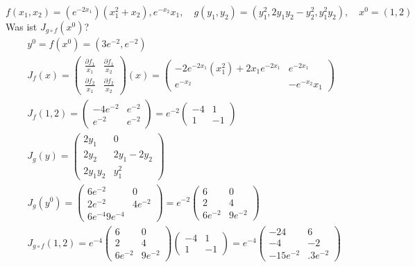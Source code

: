 \begin{beispiel*}
	\[ f(x_1,x_2)=(e^{-2x_1})(x_1^2+x_2),e^{-x_2}x_1,\quad g(y_1,y_2)=(y_1^2,2y_1y_2-y_2^2,y_1^2y_2),\quad x^0=(1,2) \]
	Was ist $ J_{g\circ f}(x^0) $?
	\begin{align*} &y^0=f(x^0)=(3e^{-2},e^{-2})\\
	&J_f(x)=\begin{pmatrix}
	\frac{\partial f_1}{x_1}&\frac{\partial f_1}{x_2}\\\frac{\partial f_2}{x_1}&\frac{\partial f_2}{x_2}
	\end{pmatrix}(x)=\begin{pmatrix}
	-2e^{-2x_1}(x_1^2)+2x_1e^{-2x_1}&e^{-2x_1}\\
	e^{-x_2}&-e^{-x_2}x_1
	\end{pmatrix}\\
	&J_f(1,2)=\begin{pmatrix}
	-4e^{-2}&e^{-2}\\e^{-2}&e^{-2}
	\end{pmatrix}=e^{-2}\begin{pmatrix}
	-4&1\\1&-1
	\end{pmatrix}\\
	&J_g(y)=\begin{pmatrix}
	2y_1&0\\2y_2&2y_1-2y_2\\2y_1y_2&y_1^2
	\end{pmatrix}\\
	&J_g(y^0)=\begin{pmatrix}
	6e^{-2}&0\\2e^{-2}&4e^{-2}\\6e^{-4}9e^{-4}
	\end{pmatrix}=e^{-2}\begin{pmatrix}
	6&0\\2&4\\6e^{-2}&9e^{-2}
	\end{pmatrix}\\
	&J_{g\circ f}(1,2)=e^{-4}\begin{pmatrix}
	6&0\\2&4\\6e^{-2}&9e^{-2}
	\end{pmatrix}\begin{pmatrix}
	-4&1\\1&-1
	\end{pmatrix}=e^{-4}\begin{pmatrix}
	-24&6\\-4&-2\\-15e^{-2}&.3e^{-2}
	\end{pmatrix} \end{align*}
\end{beispiel*}
